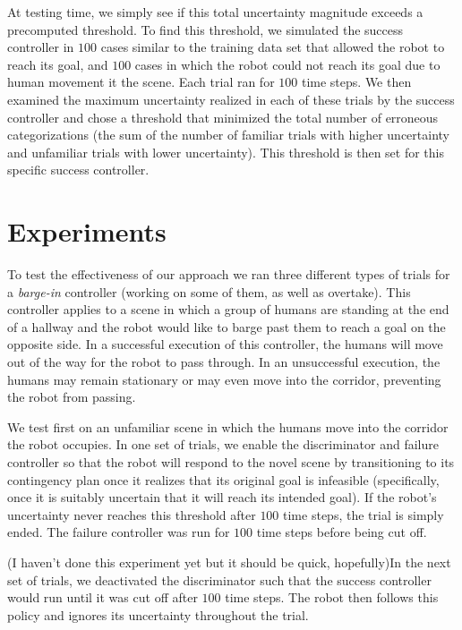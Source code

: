 \documentclass[letterpaper]{article}
\begin{document}
				At testing time, we simply see if this total uncertainty magnitude exceeds a precomputed threshold. To find this threshold, we simulated the success controller in $100$ cases similar to the training data set that allowed the robot to reach its goal, and $100$ cases in which the robot could not reach its goal due to human movement it the scene. Each trial ran for $100$ time steps. We then examined the maximum uncertainty realized in each of these trials by the success controller and chose a threshold that minimized the total number of erroneous categorizations (the sum of the number of familiar trials with higher uncertainty and unfamiliar trials with lower uncertainty). This threshold is then set for this specific success controller.
			
	\section{Experiments}\label{sec:experiments}
		To test the effectiveness of our approach we ran three different types of trials for a \textit{barge-in} controller (working on some of them, as well as overtake). This controller applies to a scene in which a group of humans are standing at the end of a hallway and the robot would like to barge past them to reach a goal on the opposite side. In a successful execution of this controller, the humans will move out of the way for the robot to pass through. In an unsuccessful execution, the humans may remain stationary or may even move into the corridor, preventing the robot from passing. 
		
		We test first on an unfamiliar scene in which the humans move into the corridor the robot occupies. In one set of trials, we enable the discriminator and failure controller so that the robot will respond to the novel scene by transitioning to its contingency plan once it realizes that its original goal is infeasible (specifically, once it is suitably uncertain that it will reach its intended goal). If the robot's uncertainty never reaches this threshold after $100$ time steps, the trial is simply ended. The failure controller was run for $100$ time steps before being cut off. 
		
		(I haven't done this experiment yet but it should be quick, hopefully)In the next set of trials, we deactivated the discriminator such that the success controller would run until it was cut off after $100$ time steps. The robot then follows this policy and ignores its uncertainty throughout the trial.
		
\end{document}

